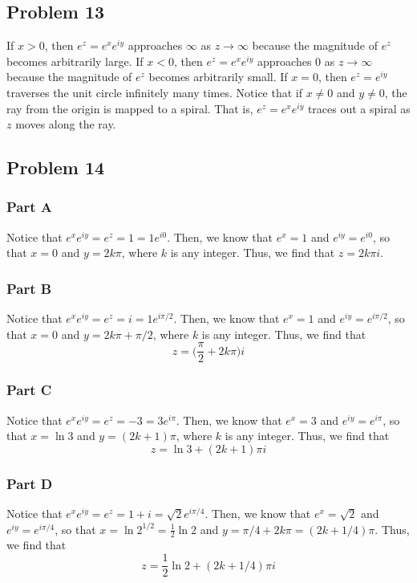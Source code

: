 \documentclass[12pt]{article}
\begin{document}
\subsection*{Problem 13}
If $x>0$, then $e^z = e^x e^{iy}$ approaches $\infty$ as $z \rightarrow \infty$ because the magnitude of $e^z$ becomes arbitrarily large. If $x < 0$, then $e^{z} = e^{x}e^{iy}$ approaches $0$ as $z \rightarrow \infty$ because the magnitude of $e^z$ becomes arbitrarily small. If $x = 0$, then $e^z = e^{iy}$ traverses the unit circle infinitely many times. Notice that if $x \neq 0$ and $y \neq 0$, the ray from the origin is mapped to a spiral. That is, $e^{z} = e^{x}e^{iy}$ traces out a spiral as $z$ moves along the ray.
\newpage
\subsection*{Problem 14}
\subsubsection*{Part A}
Notice that $e^{x}e^{iy} = e^z = 1 = 1e^{i0}$. Then, we know that $e^x = 1$ and $e^{iy} = e^{i0}$, so that $x = 0$ and $y = 2k\pi$, where $k$ is any integer. Thus, we find that $z = 2k\pi i$.
\subsubsection*{Part B}
Notice that $e^{x}e^{iy} = e^z = i = 1e^{i\pi/2}$. Then, we know that $e^x = 1$ and $e^{iy} = e^{i\pi/2}$, so that $x=0$ and $y = 2k\pi + \pi/2$, where $k$ is any integer. Thus, we find that
\[
z = \bigg(\frac{\pi}{2} + 2k\pi\bigg)i 
\]
\subsubsection*{Part C}
Notice that $e^{x}e^{iy} = e^z = -3 = 3e^{i\pi}$. Then, we know that $e^x = 3$ and $e^{iy} = e^{i\pi}$, so that $x = \ln 3$ and $y = (2k+1)\pi$, where $k$ is any integer. Thus, we find that
\[
z = \ln 3 + (2k+1)\pi i 
\]
\subsubsection*{Part D}
Notice that $e^x e^{iy} = e^z = 1 + i  = \sqrt{2}e^{i\pi/4}$. Then, we know that $e^x = \sqrt{2}$ and $e^{iy} = e^{i\pi/4}$, so that $x = \ln 2^{1/2} = \frac{1}{2} \ln 2$ and $y = \pi/4 + 2k\pi = (2k+1/4)\pi$. Thus, we find that
\[
z = \frac{1}{2}\ln 2 + (2k+1/4)\pi i 
\]
\newpage
\end{document}
